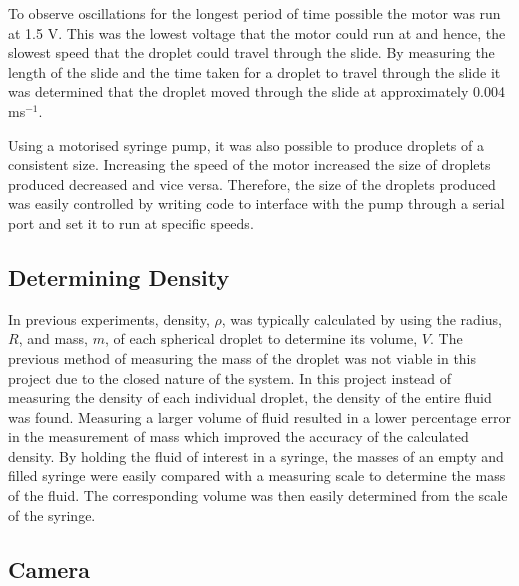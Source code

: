 \documentclass{physics_article_B}
\begin{document}
        To observe oscillations for the longest period of time possible the motor was run at 1.5 V. This was the lowest voltage that the motor could run at and hence, the slowest speed that the droplet could travel through the slide. By measuring the length of the slide and the time taken for a droplet to travel through the slide it was determined that the droplet moved through the slide at approximately 0.004 ms$^{-1}$.  
        
        Using a motorised syringe pump, it was also possible to produce droplets of a consistent size. Increasing the speed of the motor increased the size of droplets produced decreased and vice versa. Therefore, the size of the droplets produced was easily controlled by writing code to interface with the pump through a serial port and set it to run at specific speeds. 
        
        
    \subsection{Determining Density\label{sect:method:density}}
    
        In previous experiments, density, $\rho$, was typically calculated by using the radius, $R$, and mass, $m$, of each spherical droplet to determine its volume, $V$. The previous method of measuring the mass of the droplet was not viable in this project due to the closed nature of the system. In this project instead of measuring the density of each individual droplet, the density of the entire fluid was found. Measuring a larger volume of fluid resulted in a lower percentage error in the measurement of mass which improved the accuracy of the calculated density. By holding the fluid of interest in a syringe, the masses of an empty and filled syringe were easily compared with a measuring scale to determine the mass of the fluid. The corresponding volume was then easily determined from the scale of the syringe. 
        
    \subsection{Camera\label{sect:method:vision}}
        
\end{document}
